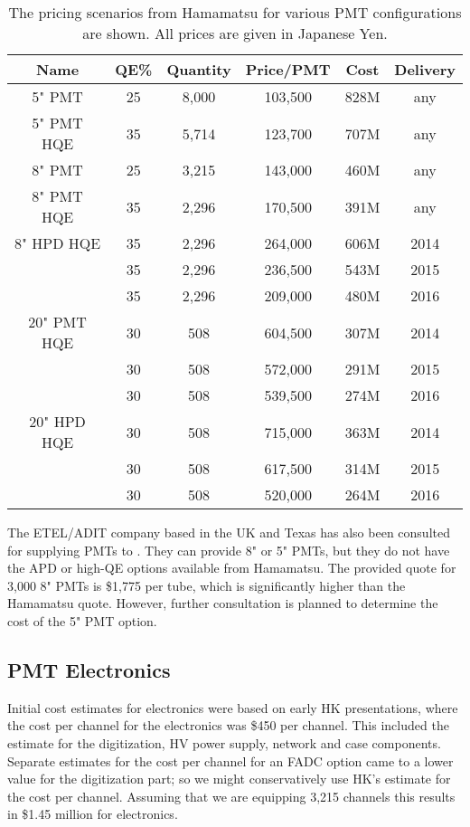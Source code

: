 \begin{table}[h!]
  \begin{center}
    \caption{The pricing scenarios from Hamamatsu for various PMT configurations are shown. All prices are given in Japanese Yen.}
    \label{tab:pmtcosts}
    \begin{tabular}{|c|c|c|c|c|c|}
      \hline
      Name & QE\% & Quantity & Price/PMT & Cost & Delivery\\
      \hline\hline
      5" PMT & 25 & 8,000 & 103,500 & 828M & any \\ \hline
      5" PMT HQE & 35  & 5,714 & 123,700 & 707M & any \\ \hline
      8" PMT & 25 & 3,215 & 143,000 & 460M & any \\ \hline
      8" PMT HQE & 35 & 2,296 & 170,500 & 391M & any \\ \hline
      8" HPD HQE & 35 & 2,296 & 264,000 & 606M & 2014 \\
      & 35 & 2,296 & 236,500 & 543M & 2015 \\
      & 35 & 2,296 & 209,000 & 480M & 2016 \\ \hline
      20" PMT HQE & 30 & 508 & 604,500 & 307M & 2014 \\
      & 30 & 508 & 572,000 & 291M & 2015 \\
      & 30 & 508 & 539,500 & 274M & 2016 \\ \hline
      20" HPD HQE & 30 & 508 & 715,000 & 363M & 2014 \\
      & 30 & 508 & 617,500 & 314M & 2015 \\
      & 30 & 508 & 520,000 & 264M & 2016 \\ \hline
    \end{tabular}
  \end{center}
\end{table}

The ETEL/ADIT company based in the UK and Texas has also been consulted for supplying PMTs to \nuprism. They can provide 8" or 5" PMTs, but they do not have the APD or high-QE options available from Hamamatsu. The provided quote for 3,000 8" PMTs is \$1,775 per tube, which is significantly higher than the Hamamatsu quote. However, further consultation is planned to determine the cost of the 5" PMT option.

\subsection{PMT Electronics}

Initial cost estimates for \nuprism electronics were based on early HK presentations, where the cost per channel for the electronics was \$450 per channel.
This included the estimate for the digitization, HV power supply, network and case components.
Separate estimates for the cost per channel for an FADC option came to a lower value for the digitization part; 
so we might conservatively use HK's estimate for the cost per channel. Assuming that we are equipping 3,215 channels this results in \$1.45 million for \nuprism electronics.

